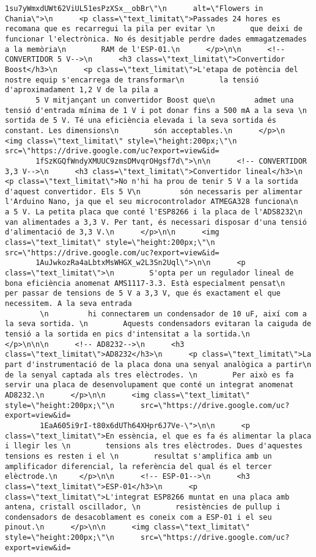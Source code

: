 \begin{lstlisting}[style=myArduino]
       1su7yWmxdUWt62ViUL51esPzXSx__obBr\"\n      alt=\"Flowers in Chania\">\n      <p class=\"text_limitat\">Passades 24 hores es recomana que es recarregui la pila per evitar \n        que deixi de funcionar l'electrònica. No és desitjable perdre dades emmagatzemades a la memòria\n        RAM de l'ESP-01.\n      </p>\n\n      <!-- CONVERTIDOR 5 V-->\n      <h3 class=\"text_limitat\">Convertidor Boost</h3>\n      <p class=\"text_limitat\">L'etapa de potència del nostre equip s'encarrega de transformar\n        la tensió d'aproximadament 1,2 V de la pila a 
       5 V mitjançant un convertidor Boost que\n         admet una tensió d'entrada mínima de 1 V i pot donar fins a 500 mA a la seva \n       sortida de 5 V. Té una eficiència elevada i la seva sortida és constant. Les dimensions\n        són acceptables.\n      </p>\n      <img class=\"text_limitat\" style=\"height:200px;\"\n      src=\"https://drive.google.com/uc?export=view&id=
       1fSzKGQfWndyXMUUC9zmsDMvqrOHgsf7d\">\n\n      <!-- CONVERTIDOR 3,3 V-->\n      <h3 class=\"text_limitat\">Convertidor lineal</h3>\n      <p class=\"text_limitat\">No n'hi ha prou de tenir 5 V a la sortida d'aquest convertidor. Els 5 V\n         són necessaris per alimentar l'Arduino Nano, ja que el seu microcontrolador ATMEGA328 funciona\n          a 5 V. La petita placa que conté l'ESP8266 i la placa de l'ADS8232\n         van alimentades a 3,3 V. Per tant, és necessari disposar d'una tensió d'alimentació de 3,3 V.\n      </p>\n\n      <img class=\"text_limitat\" style=\"height:200px;\"\n      src=\"https://drive.google.com/uc?export=view&id=
       1AuJwkozRa4aLbtxMsWHGX_w2L3Sn2Uql\">\n\n      <p class=\"text_limitat\">\n        S'opta per un regulador lineal de bona eficiència anomenat AMS1117-3.3. Està especialment pensat\n         per passar de tensions de 5 V a 3,3 V, que és exactament el que necessitem. A la seva entrada
        \n         hi connectarem un condensador de 10 uF, així com a la seva sortida. \n        Aquests condensadors evitaran la caiguda de tensió a la sortida en pics d'intensitat a la sortida.\n      </p>\n\n\n      <!-- AD8232-->\n      <h3 class=\"text_limitat\">AD8232</h3>\n      <p class=\"text_limitat\">La part d'instrumentació de la placa dona una senyal analògica a partir\n         de la senyal captada als tres elèctrodes. \n        Per això es fa servir una placa de desenvolupament que conté un integrat anomenat AD8232.\n      </p>\n\n      <img class=\"text_limitat\" style=\"height:200px;\"\n      src=\"https://drive.google.com/uc?export=view&id=
        1EaA605i9rI-t80x6dUTh64XHpr6J7Ve-\">\n\n      <p class=\"text_limitat\">En essència, el que es fa és alimentar la placa i llegir les \n        tensions als tres elèctrodes. Dues d'aquestes tensions es resten i el \n        resultat s'amplifica amb un amplificador diferencial, la referència del qual és el tercer elèctrode.\n     </p>\n\n      <!-- ESP-01-->\n      <h3 class=\"text_limitat\">ESP-01</h3>\n      <p class=\"text_limitat\">L'integrat ESP8266 muntat en una placa amb antena, cristall oscillador, \n        resistències de pullup i condensadors de desacoblament es coneix com a ESP-01 i el seu pinout.\n      </p>\n\n      <img class=\"text_limitat\" style=\"height:200px;\"\n      src=\"https://drive.google.com/uc?export=view&id=

\end{lstlisting}
